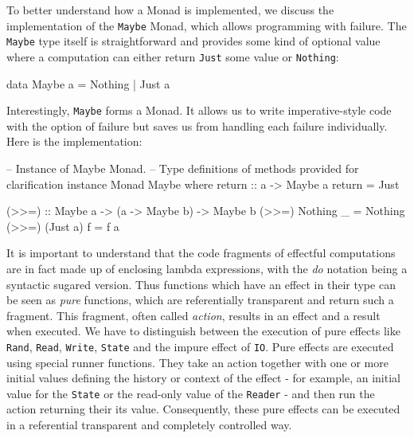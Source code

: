 To better understand how a Monad is implemented, we discuss the implementation of the \texttt{Maybe} Monad, which allows programming with failure. The \texttt{Maybe} type itself is straightforward and provides some kind of optional value where a computation can either return \texttt{Just} some value or \texttt{Nothing}:

\begin{HaskellCode}
data Maybe a = Nothing | Just a
\end{HaskellCode}

Interestingly, \texttt{Maybe} forms a Monad. It allows us to write imperative-style code with the option of failure but saves us from handling each failure individually. Here is the implementation:

\begin{HaskellCode}
-- Instance of Maybe Monad.
-- Type definitions of methods provided for clarification
instance Monad Maybe where
  return :: a -> Maybe a
  return = Just
  
  (>>=) :: Maybe a -> (a -> Maybe b) -> Maybe b
  (>>=) Nothing _  = Nothing
  (>>=) (Just a) f = f a 
\end{HaskellCode}

\medskip

It is important to understand that the code fragments of effectful computations are in fact  made up of enclosing lambda expressions, with the \textit{do} notation being a syntactic sugared version. Thus functions which have an effect in their type can be seen as \textit{pure} functions, which are referentially transparent and return such a fragment. This fragment, often called \textit{action}, results in an effect and a result when executed. We have to distinguish between the execution of pure effects like \texttt{Rand}, \texttt{Read}, \texttt{Write}, \texttt{State} and the impure effect of \texttt{IO}. Pure effects are executed using special runner functions. They take an action together with one or more initial values defining the history or context of the effect - for example, an initial value for the \texttt{State} or the read-only value of the \texttt{Reader} - and then run the action returning their its value. Consequently, these pure effects can be executed in a referential transparent and completely controlled way.

